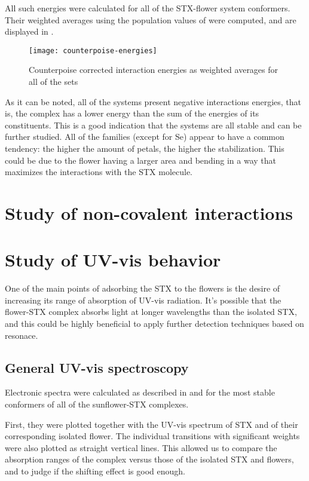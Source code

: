 All such energies were calculated for all of the STX-flower system conformers.
Their weighted averages using the population values of  were computed, and are displayed in .

\begin{figure}
    \texttt{[image: counterpoise-energies]}
    \caption[Counterpoise corrected interaction energies]{Counterpoise corrected interaction energies as weighted averages for all of the sets}
\end{figure}

As it can be noted, all of the systems present negative interactions energies, that is, the complex has a lower energy than the sum of the energies of its constituents.
This is a good indication that the systems are all stable and can be further studied.
All of the families (except for Se) appear to have a common tendency: the higher the amount of petals, the higher the stabilization. This could be due to the flower having a larger area and bending in a way that maximizes the interactions with the STX molecule.

\section{Study of non-covalent interactions}
\blindtext

\section{Study of UV-vis behavior}
One of the main points of adsorbing the STX to the flowers is the desire of increasing its range of absorption of UV-vis radiation.
It's possible that the flower-STX complex absorbs light at longer wavelengths than the isolated STX, and this could be highly beneficial to apply further detection techniques based on resonace.

\subsection{General UV-vis spectroscopy}
Electronic spectra were calculated as described in  and  for the most stable conformers of all of the sunflower-STX complexes.

First, they were plotted together with the UV-vis spectrum of STX and of their corresponding isolated flower.
The individual transitions with significant weights were also plotted as straight vertical lines.
This allowed us to compare the absorption ranges of the complex versus those of the isolated STX and flowers, and to judge if the shifting effect is good enough.

